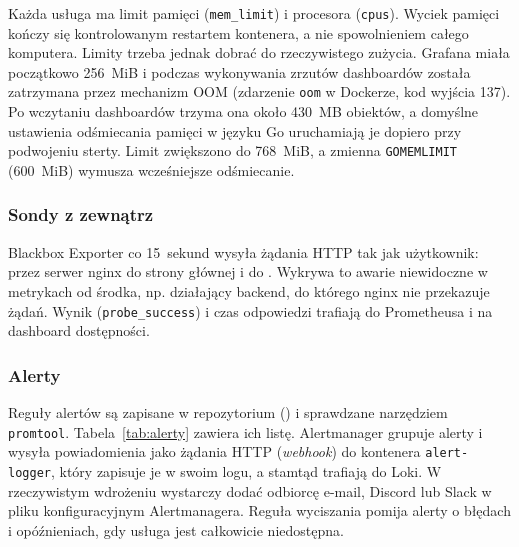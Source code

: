 Każda usługa ma limit pamięci (\texttt{mem\_limit}) i procesora
(\texttt{cpus}). Wyciek pamięci kończy się kontrolowanym restartem kontenera,
a nie spowolnieniem całego komputera. Limity trzeba jednak dobrać do
rzeczywistego zużycia. Grafana miała początkowo 256~MiB i podczas
wykonywania zrzutów dashboardów została zatrzymana przez mechanizm OOM
(zdarzenie \texttt{oom} w Dockerze, kod wyjścia 137). Po wczytaniu
dashboardów trzyma ona około 430~MB obiektów, a domyślne ustawienia
odśmiecania pamięci w języku Go uruchamiają je dopiero przy podwojeniu sterty.
Limit zwiększono do 768~MiB, a zmienna \texttt{GOMEMLIMIT} (600~MiB) wymusza
wcześniejsze odśmiecanie.

\subsubsection{Sondy z zewnątrz}

Blackbox Exporter co 15~sekund wysyła żądania HTTP tak jak użytkownik: przez
serwer nginx do strony głównej i do . Wykrywa to
awarie niewidoczne w metrykach od środka, np. działający backend, do którego
nginx nie przekazuje żądań. Wynik (\texttt{probe\_success}) i czas odpowiedzi
trafiają do Prometheusa i na dashboard dostępności.

\subsubsection{Alerty}

Reguły alertów są zapisane w repozytorium ()
i sprawdzane narzędziem \texttt{promtool}. Tabela~\ref{tab:alerty} zawiera
ich listę. Alertmanager grupuje alerty i wysyła powiadomienia jako żądania
HTTP (\emph{webhook}) do kontenera \texttt{alert-logger}, który zapisuje je
w swoim logu, a stamtąd trafiają do Loki. W rzeczywistym wdrożeniu wystarczy dodać
odbiorcę e-mail, Discord lub Slack w pliku konfiguracyjnym Alertmanagera.
Reguła wyciszania pomija alerty o błędach i opóźnieniach, gdy usługa jest
całkowicie niedostępna.


